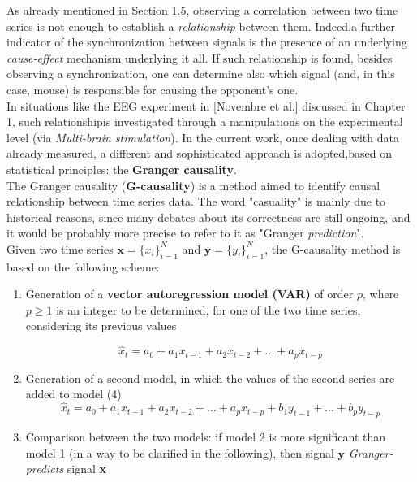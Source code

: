 \documentclass[a4paper]{article}
\begin{document}
As already mentioned in Section 1.5, observing a correlation between two time series 
is not enough to establish a \textit{relationship} between them. Indeed,a further indicator of  the synchronization between signals is the presence of an underlying \textit{cause-effect} mechanism underlying it all. If such relationship is found, besides observing a synchronization, one can determine also which signal (and, in this case, mouse) is responsible for causing the opponent's one.\\
In situations like the EEG experiment in [Novembre et al.] discussed in Chapter 1, such relationshipis investigated through a manipulations on the experimental level (via \textit{Multi-brain stimulation}). In  the current work, once dealing with data already measured, a different and sophisticated approach is adopted,based on statistical principles: the \textbf{Granger causality}.\\
The Granger causality (\textbf{G-causality}) is a method aimed to identify causal relationship between time series data. The word "casuality" is mainly due to historical reasons, since many debates about its correctness are still ongoing, and it would be probably more precise to refer to it as "Granger \textit{prediction}".
\\

Given two time series $ \textbf{x} = \{x_i\}_{i=1}^N$ and  $\textbf{y} = \{y_i\}_{i=1}^N$, the G-causality method is based on the following scheme:

\begin{enumerate}
	
	\item Generation of a \textbf{vector autoregression model (VAR)} of order $p$, where $p\ge 1$ is an integer to be determined, for one of the two time series, considering its previous values
	
	\begin{equation}
	\hat{x}_t = a_0 + a_1 x_{t-1} + a_2 x_{t-2} + \dots + a_p x_{t-p}
	\end{equation}
	
	
	\item Generation of a second model, in which the values of the second series are added  to  model (4)
	\begin{equation}
	\hat{x}_t = a_0 + a_1 x_{t-1} + a_2 x_{t-2} + \dots + a_p x_{t-p} + b_1 y_{t-1} + \dots + b_p y_{t-p}
	\end{equation}
	
	
	\item Comparison between the two models: if model 2 is more significant  than model 1 (in a way to be clarified in the following), then signal $\textbf{y}$ \textit{Granger-predicts} signal \textbf{x} 
	
\end{enumerate}
\end{document}

